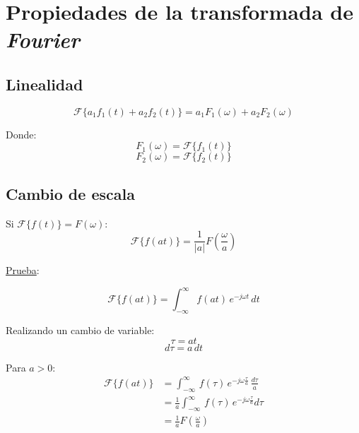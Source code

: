 \section{Propiedades de la transformada de \emph{Fourier}}
\subsection{Linealidad}
\begin{equation}
    \mathcal{F}\{a_1f_1(t)+a_2f_2(t)\}=a_1F_1(\omega)+a_2F_2(\omega)
\end{equation}

Donde:
\begin{equation*}
    F_1(\omega)=\mathcal{F}\{f_1(t)\}
\end{equation*}
\begin{equation*}
    F_2(\omega)=\mathcal{F}\{f_2(t)\}
\end{equation*}

\subsection{Cambio de escala}
Si $\mathcal{F}\{f(t)\}=F(\omega)$:
\begin{equation}
    \mathcal{F}\{f(at)\}=\frac{1}{|a|}F\left(\frac{\omega}{a}\right)
\end{equation}

\underline{Prueba}:

\begin{equation*}
    \mathcal{F}\{f(at)\}=\int_{-\infty}^\infty f(at)\,e^{-j\omega t}\,dt
\end{equation*}

Realizando un cambio de variable:
\begin{equation*}
    \tau=at
\end{equation*}
\begin{equation*}
    d\tau=a\,dt
\end{equation*}

Para $a>0$:
\begin{equation*}
\begin{split}
    \mathcal{F}\{f(at)\}
        &=\int_{-\infty}^\infty\,f(\tau)\,e^{-j\omega
            \frac{\tau}{a}}\,\frac{d\tau}{a}\\
        &=\frac{1}{a}\int_{-\infty}^\infty\,f(\tau)\,e^{-j\omega
            \frac{\tau}{a}}d\tau\\
        &=\frac{1}{a}F\left(\frac{\omega}{a}\right)\\
\end{split}
\end{equation*}

